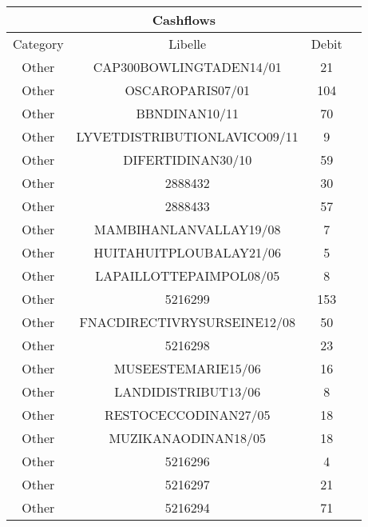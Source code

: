 \begin{longtable}{|c|c|c|c|}
\hline
\multicolumn{4}{|c|}{Cashflows} \\
\hline
Category & Libelle & Debit \\
\hline
Other & CAP300BOWLINGTADEN14/01 & 21\\
\hline
Other & OSCAROPARIS07/01 & 104\\
\hline
Other & BBNDINAN10/11 & 70\\
\hline
Other & LYVETDISTRIBUTIONLAVICO09/11 & 9\\
\hline
Other & DIFERTIDINAN30/10 & 59\\
\hline
Other & 2888432 & 30\\
\hline
Other & 2888433 & 57\\
\hline
Other & MAMBIHANLANVALLAY19/08 & 7\\
\hline
Other & HUITAHUITPLOUBALAY21/06 & 5\\
\hline
Other & LAPAILLOTTEPAIMPOL08/05 & 8\\
\hline
Other & 5216299 & 153\\
\hline
Other & FNACDIRECTIVRYSURSEINE12/08 & 50\\
\hline
Other & 5216298 & 23\\
\hline
Other & MUSEESTEMARIE15/06 & 16\\
\hline
Other & LANDIDISTRIBUT13/06 & 8\\
\hline
Other & RESTOCECCODINAN27/05 & 18\\
\hline
Other & MUZIKANAODINAN18/05 & 18\\
\hline
Other & 5216296 & 4\\
\hline
Other & 5216297 & 21\\
\hline
Other & 5216294 & 71\\
\hline
\end{longtable}

